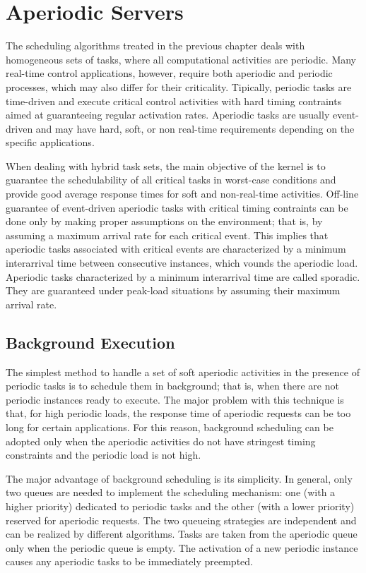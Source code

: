 \chapter{Aperiodic Servers}
The scheduling algorithms treated in the previous chapter deals with homogeneous sets of tasks, where all computational activities are periodic. Many real-time control applications, however, require both aperiodic and periodic processes, which may also differ for their criticality. Tipically, periodic tasks are time-driven and execute critical control activities with hard timing contraints aimed at guaranteeing regular activation rates. Aperiodic tasks are usually event-driven and may have hard, soft, or non real-time requirements depending on the specific applications.

When dealing with hybrid task sets, the main objective of the kernel is to guarantee the schedulability of all critical tasks in worst-case conditions and provide good average response times for soft and non-real-time activities. Off-line guarantee of event-driven aperiodic tasks with critical timing contraints can be done only by making proper assumptions on the environment; that is, by assuming a maximum arrival rate for each critical event. This implies that aperiodic tasks associated with critical events are characterized by a minimum interarrival time between consecutive instances, which vounds the aperiodic load. Aperiodic tasks characterized by a minimum interarrival time are called sporadic. They are guaranteed under peak-load situations by assuming their maximum arrival rate.

\section{Background Execution}
The simplest method to handle a set of soft aperiodic activities in the presence of periodic tasks is to schedule them in background; that is, when there are not periodic instances ready to execute. The major problem with this technique is that, for high periodic loads, the response time of aperiodic requests can be too long for certain applications. For this reason, background scheduling can be adopted only when the aperiodic activities do not have stringest timing constraints and the periodic load is not high.

The major advantage of background scheduling is its simplicity. In general, only two queues are needed to implement the scheduling mechanism: one (with a higher priority) dedicated to periodic tasks and the other (with a lower priority) reserved for aperiodic requests. The two queueing strategies are independent and can be realized by different algorithms. Tasks are taken from the aperiodic queue only when the periodic queue is empty. The activation of a new periodic instance causes any aperiodic tasks to be immediately preempted.

